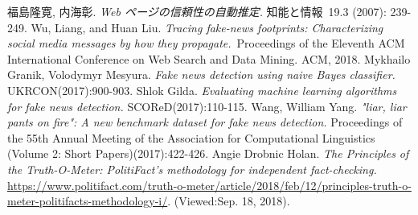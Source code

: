 \documentclass[twocolumn, a4paper, uplatex]{UECIEresume}
\begin{document}
{\small
\begin{thebibliography}{*}
  福島隆寛, 内海彰. \textit{Web ページの信頼性の自動推定.} 知能と情報 19.3 (2007): 239-249.
  Wu, Liang, and Huan Liu. \textit{Tracing fake-news footprints: Characterizing social media messages by how they propagate.} Proceedings of the Eleventh ACM International Conference on Web Search and Data Mining. ACM, 2018.
  Mykhailo Granik, Volodymyr Mesyura. \textit{Fake news detection using naive Bayes classifier.} UKRCON(2017):900-903.
  Shlok Gilda. \textit{Evaluating machine learning algorithms for fake news detection.} SCOReD(2017):110-115.
  Wang, William Yang. \textit{"liar, liar pants on fire": A new benchmark dataset for fake news detection.} Proceedings of the 55th Annual Meeting of the Association for Computational Linguistics (Volume 2: Short Papers)(2017):422-426.
  Angie Drobnic Holan. \textit{The Principles of the Truth-O-Meter: PolitiFact’s methodology for independent fact-checking.} \url{https://www.politifact.com/truth-o-meter/article/2018/feb/12/principles-truth-o-meter-politifacts-methodology-i/}. (Viewed:Sep. 18, 2018).
\end{thebibliography}
}
\end{document}
